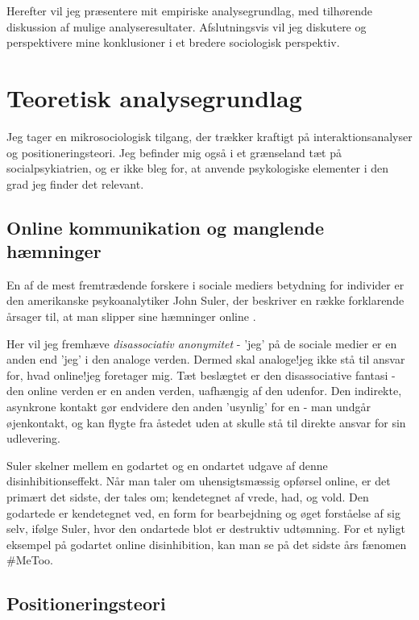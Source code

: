 Herefter vil jeg præsentere mit empiriske analysegrundlag, med
tilhørende diskussion af mulige analyseresultater. Afslutningsvis
vil jeg diskutere og perspektivere mine konklusioner i et bredere
sociologisk perspektiv.

\section{Teoretisk analysegrundlag}

Jeg tager en mikrosociologisk tilgang, der trækker kraftigt på
interaktionsanalyser og positioneringsteori. Jeg befinder mig også
i et grænseland tæt på socialpsykiatrien, og er ikke bleg for, at
anvende psykologiske elementer i den grad jeg finder det relevant.

\subsection{Online kommunikation og manglende hæmninger}

En af de mest fremtrædende forskere i sociale mediers betydning
for individer er den amerikanske psykoanalytiker John Suler, der
beskriver en række forklarende årsager til, at man slipper sine
hæmninger online \autocite{sulerOnlineDisinhibitionEffect2004}.

Her vil jeg fremhæve \emph{disassociativ anonymitet} - 'jeg' på de 
sociale medier er en anden end 'jeg' i den analoge verden. Dermed
skal analoge!jeg ikke stå til ansvar for, hvad online!jeg 
foretager mig. Tæt beslægtet er den disassociative fantasi - den
online verden er en anden verden, uafhængig af den udenfor. Den
indirekte, asynkrone kontakt gør endvidere den anden 'usynlig' for
en - man undgår øjenkontakt, og kan flygte fra åstedet uden at
skulle stå til direkte ansvar for sin udlevering.

Suler skelner mellem en godartet og en ondartet udgave af denne
disinhibitionseffekt. Når man taler om uhensigtsmæssig opførsel
online, er det primært det sidste, der tales om; kendetegnet af
vrede, had, og vold. Den godartede er kendetegnet ved, en form for
bearbejdning og øget forståelse af sig selv, ifølge Suler, hvor
den ondartede blot er destruktiv udtømning. For et nyligt eksempel
på godartet online disinhibition, kan man se på det sidste års
fænomen \#MeToo.

\subsection{Positioneringsteori}

